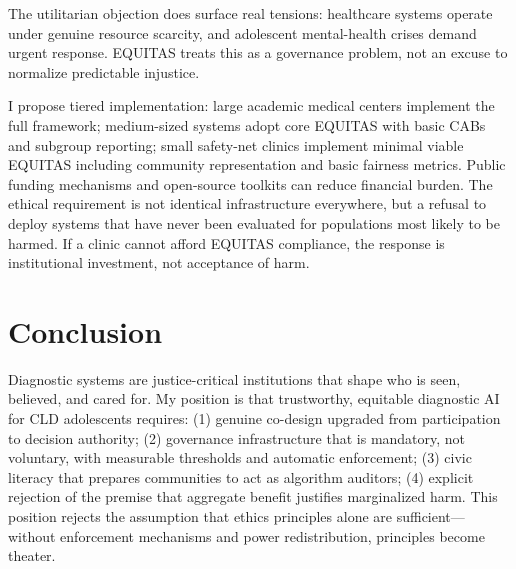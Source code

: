 \documentclass[12pt,a4paper]{article}
\begin{document}
The utilitarian objection does surface real tensions: healthcare systems operate under genuine resource scarcity, and adolescent mental-health crises demand urgent response. EQUITAS treats this as a governance problem, not an excuse to normalize predictable injustice.

I propose tiered implementation: large academic medical centers implement the full framework; medium-sized systems adopt core EQUITAS with basic CABs and subgroup reporting; small safety-net clinics implement minimal viable EQUITAS including community representation and basic fairness metrics. Public funding mechanisms and open-source toolkits can reduce financial burden. The ethical requirement is not identical infrastructure everywhere, but a refusal to deploy systems that have never been evaluated for populations most likely to be harmed. If a clinic cannot afford EQUITAS compliance, the response is institutional investment, not acceptance of harm.

\section{Conclusion}

\begin{tcolorbox}[colback=questionbg,colframe=questionborder,title=\textbf{GUIDING QUESTION:} Sum up your position]
\end{tcolorbox}

Diagnostic systems are justice-critical institutions that shape who is seen, believed, and cared for. My position is that trustworthy, equitable diagnostic AI for CLD adolescents requires: (1) genuine co-design upgraded from participation to decision authority; (2) governance infrastructure that is mandatory, not voluntary, with measurable thresholds and automatic enforcement; (3) civic literacy that prepares communities to act as algorithm auditors; (4) explicit rejection of the premise that aggregate benefit justifies marginalized harm. This position rejects the assumption that ethics principles alone are sufficient—without enforcement mechanisms and power redistribution, principles become theater.

\begin{tcolorbox}[colback=questionbg,colframe=questionborder,title=\textbf{GUIDING QUESTION:} Clarify its practical implications for individuals and society]
\end{tcolorbox}
\end{document}
